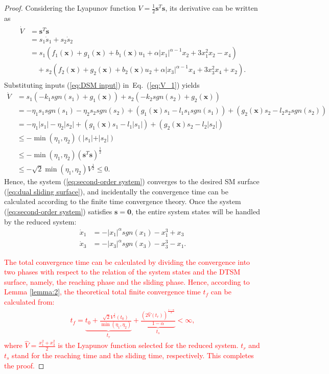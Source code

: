 \documentclass[3p]{elsarticle}
\theoremstyle{plain}
\theoremstyle{remark}
\begin{document}
\begin{proof}
Considering the Lyapunov function $V=\frac{1}{2}{\bm s}^T\bm s$, its derivative can be written as
\begin{align}
\begin{split}
\dot V &= {\bm s}^T\dot{\bm  s}\\
&=s_1\dot s_1+s_2\dot s_2\\
&=s_1(f_1(\bm x)+g_1(\bm x)+b_1(\bm x)u_1+\alpha\vert x_1\vert^{\alpha-1}x_2+3x_1^2x_2-x_4)\\
&\quad +s_2(f_2(\bm x)+g_2(\bm x)+b_2(\bm x)u_2+\alpha\vert x_3\vert^{\alpha-1}x_4+3x_3^2x_4+x_2).\label{eq:V_1}
\end{split}
\end{align}
Substituting inputs (\ref{eq:DSM input}) in~Eq.~(\ref{eq:V_1}) yields
\begin{align*}
\dot V &= s_1(-k_1sgn(s_1)+g_1(\bm x))+s_2(-k_2sgn(s_2)+g_2(\bm x))\\
&= -\eta_1s_1sgn(s_1)-\eta_2s_2sgn(s_2)+(g_1(\bm x)s_1 - l_1s_1sgn(s_1))+(g_2(\bm x)s_2 - l_2s_2sgn(s_2))\\
&= -\eta_1\vert s_1\vert-\eta_2\vert s_2\vert+(g_1(\bm x)s_1 - l_1\vert s_1\vert)+(g_2(\bm x)s_2 - l_2\vert s_2\vert)\\
&\le - \min(\eta_1,\eta_2)(\vert s_1\vert+\vert s_2\vert)\\
&\le -\min(\eta_1,\eta_2)({\bm s}^T\bm s)^\frac{1}{2}\\
&\le -\sqrt{2}\min(\eta_1,\eta_2)V^\frac{1}{2}\le 0.
\end{align*}
Hence, the system (\ref{eq:second-order system}) converges to the desired SM surface (\ref{eq:dual sliding surface}), and incidentally the convergence time can be calculated according to the finite time convergence theory. Once the system (\ref{eq:second-order system}) satisfies $\bm s = \bm 0$, the entire system states will be handled by the reduced system:
\begin{align*}
\dot x_1&=-\vert x_1\vert^\alpha sgn(x_1)-x_1^3+x_3\\
\dot x_3&=-\vert x_3\vert^\alpha sgn(x_3)-x_3^3-x_1.
\end{align*}\par
\textcolor{red}{The total convergence time can be calculated by dividing the convergence into two phases with respect to the relation of the system states and the DTSM surface, namely, the reaching phase and the sliding phase. Hence, according to Lemma \ref{lemma:2}, the theoretical total finite convergence time $t_f$ can be calculated from:
\begin{align}
t_f = \underbrace{t_0+\frac{\sqrt{2}V^{\frac{1}{2}}(t_0)}{\min(\eta_1,\eta_2)}}_{t_r}+\underbrace{\frac{(2\hat V(t_r))^{\frac{1-\alpha}{2}}}{1-\alpha}}_{t_s}<\infty,
\end{align}
where $\hat V = \frac{x_1^2+x_3^2}{2}$ is the Lyapunov function selected for the reduced system. $t_r$ and $t_s$ stand for the reaching time and the sliding time, respectively. This completes the proof.}
\end{proof}
\end{document}
